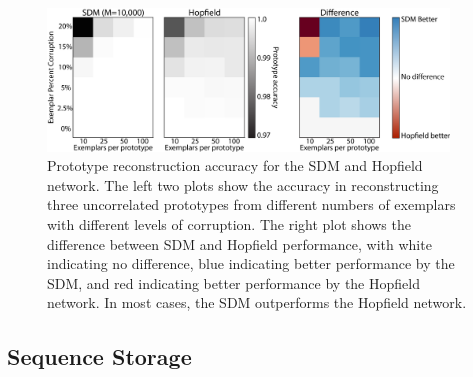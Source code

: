 \documentclass[10pt,letterpaper]{article}
\begin{document}
\begin{figure}[t!]
  \begin{center}
    \includegraphics[width=0.95\textwidth]{./figures/prototype-edit.png}
  \end{center}
  \caption{Prototype reconstruction accuracy for the SDM and Hopfield
    network. The left two plots show the accuracy in reconstructing
    three uncorrelated prototypes from different numbers of exemplars
    with different levels of corruption. The right plot shows the
    difference between SDM and Hopfield performance, with white
    indicating no difference, blue indicating better performance by
    the SDM, and red indicating better performance by the Hopfield
    network. In most cases, the SDM outperforms the Hopfield network.}
  \label{fig:prototype-comparison}
\end{figure}


\subsection{Sequence Storage}
\end{document}

